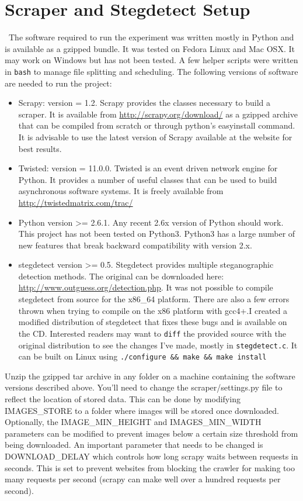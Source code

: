 \appendix
\appendixpage
\addappheadtotoc
\chapter{Scraper and Stegdetect Setup}
\
The software required to run the experiment was written mostly in Python and is available as a gzipped bundle. It was tested on Fedora Linux and Mac OSX. It may work on Windows but has not been tested. A few helper scripts were written in \texttt{bash} to manage file splitting and scheduling. The following versions of software are needed  to run the project:
\begin{itemize}
\item{Scrapy}: version = 1.2. Scrapy provides the classes necessary to build a scraper. It is available from \url{http://scrapy.org/download/} as a gzipped archive that can be compiled from scratch or through python's easyinstall command. It is advisable to use the latest version of Scrapy available at the website for best results. 
\item{Twisted}: version = 11.0.0. Twisted is an event driven network engine for Python. It provides a number of useful classes that can be used to build asynchronous software systems. It is freely available from \url{http://twistedmatrix.com/trac/}
\item{Python} version >= 2.6.1. Any recent 2.6x version of Python should work. This project has not been tested on Python3. Python3 has a large number of new features that break backward compatibility with version 2.x.
\item{stegdetect} version >= 0.5. Stegdetect provides multiple steganographic detection methods. The original can be downloaded here: \url{http://www.outguess.org/detection.php}. It was not possible to compile stegdetect from source for the x86\_64 platform. There are also a few errors thrown when trying to compile on the x86 platform with gcc4+.I created a modified distribution of stegdetect that fixes these bugs and is available on the CD. Interested readers may want to \texttt{diff} the provided source with the original distribution to see the changes I've made, mostly in \texttt{stegdetect.c}. It can be built on Linux using \texttt{./configure \&\& make \&\& make install}
\end{itemize}
Unzip the gzipped tar archive in any folder on a machine containing the software versions described above. You'll need to change the scraper/settings.py file to reflect the location of stored data. This can be done by modifying IMAGES\_STORE to a folder where images will be stored once downloaded. Optionally, the IMAGE\_MIN\_HEIGHT and IMAGES\_MIN\_WIDTH parameters can be modified to prevent images below a certain size threshold from being downloaded. An important parameter that needs to be changed is DOWNLOAD\_DELAY which controls how long scrapy waits between requests in seconds. This is set to prevent websites from blocking the crawler for making too many requests per second (scrapy can make well over a hundred requests per second).
